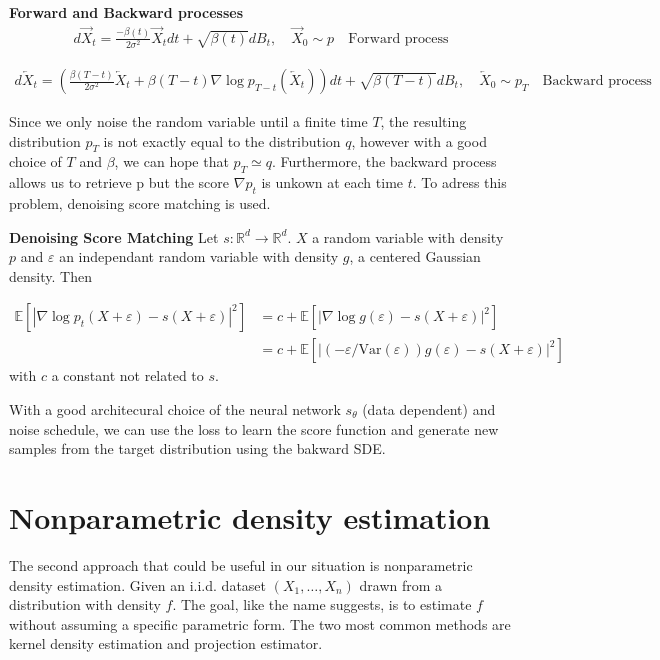 \documentclass{article}
\begin{document}
\textbf{Forward and Backward processes}
\begin{align}
    d\overrightarrow{X}_t = \frac{-\beta(t)}{2\sigma^2}\overrightarrow{X}_t dt + \sqrt{\beta(t)}dB_t, \quad \overrightarrow{X}_0\sim p 
    \quad \text{Forward process}
\end{align} 

\begin{align}
    d\overleftarrow{X}_t=\left(  \frac{\beta(T-t)}{2\sigma^2}\overleftarrow{X}_t+\beta(T-t)\nabla\log p_{T-t}\left(\overleftarrow{X}_t \right)  \right)dt + \sqrt{\beta(T-t)}dB_t, \quad \overleftarrow{X}_0\sim p_T \quad \text{Backward process}
\end{align}

Since we only noise the random variable until a finite time \(T\), the resulting distribution \(p_T\) is not exactly equal to the distribution \(q\), however with a good choice of \(T\) and \(\beta\), we can hope that \(p_T\simeq q\). Furthermore, the backward process allows us to retrieve p but the score \(\nabla p_t\) is unkown at each time \(t\). To adress this problem, denoising score matching is used.  

\bigskip
\textbf{Denoising Score Matching} \newline
Let \(s:\mathbb{R}^d\rightarrow\mathbb{R}^d\). \(X\) a random variable with density \(p\) and \(\varepsilon\) an independant random variable with density \(g\), a centered Gaussian density. Then 

\begin{align}
    \mathbb{E}[|\nabla \log p_t (X+\varepsilon)-s(X+\varepsilon)|^2]&=c+\mathbb{E}[|\nabla \log g(\varepsilon)-s(X+\varepsilon)|^2]\\
    &=c+\mathbb{E}[|(-\varepsilon/\text{Var} (\varepsilon))g(\varepsilon)-s(X+\varepsilon)|^2]
\end{align}
with \(c\) a constant not related to \(s\).

With a good architecural choice of the neural network \(s_\theta\) (data dependent) and noise schedule, we can use the loss to learn the score function and generate new samples from the target distribution using the bakward SDE.


\section{Nonparametric density estimation}
The second approach that could be useful in our situation is nonparametric density estimation. Given an i.i.d. dataset \((X_1,\ldots,X_n)\) drawn from a distribution with density \(f\). The goal, like the name suggests, is to estimate \(f\) without assuming a specific parametric form. The two most common methods are kernel density estimation and projection estimator. 
\end{document}
